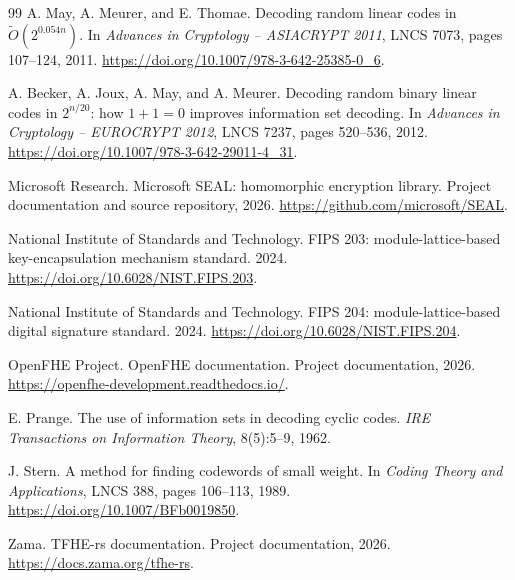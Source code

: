 \begin{thebibliography}{99}
A. May, A. Meurer, and E. Thomae.
Decoding random linear codes in $\widetilde{O}(2^{0.054n})$.
In \emph{Advances in Cryptology -- ASIACRYPT 2011}, LNCS 7073, pages 107--124, 2011.
\url{https://doi.org/10.1007/978-3-642-25385-0_6}.

A. Becker, A. Joux, A. May, and A. Meurer.
Decoding random binary linear codes in $2^{n/20}$: how $1+1=0$ improves information set decoding.
In \emph{Advances in Cryptology -- EUROCRYPT 2012}, LNCS 7237, pages 520--536, 2012.
\url{https://doi.org/10.1007/978-3-642-29011-4_31}.

Microsoft Research.
Microsoft SEAL: homomorphic encryption library.
Project documentation and source repository, 2026.
\url{https://github.com/microsoft/SEAL}.

National Institute of Standards and Technology.
FIPS 203: module-lattice-based key-encapsulation mechanism standard.
2024.
\url{https://doi.org/10.6028/NIST.FIPS.203}.

National Institute of Standards and Technology.
FIPS 204: module-lattice-based digital signature standard.
2024.
\url{https://doi.org/10.6028/NIST.FIPS.204}.

OpenFHE Project.
OpenFHE documentation.
Project documentation, 2026.
\url{https://openfhe-development.readthedocs.io/}.

E. Prange.
The use of information sets in decoding cyclic codes.
\emph{IRE Transactions on Information Theory}, 8(5):5--9, 1962.

J. Stern.
A method for finding codewords of small weight.
In \emph{Coding Theory and Applications}, LNCS 388, pages 106--113, 1989.
\url{https://doi.org/10.1007/BFb0019850}.

Zama.
TFHE-rs documentation.
Project documentation, 2026.
\url{https://docs.zama.org/tfhe-rs}.

\end{thebibliography}
